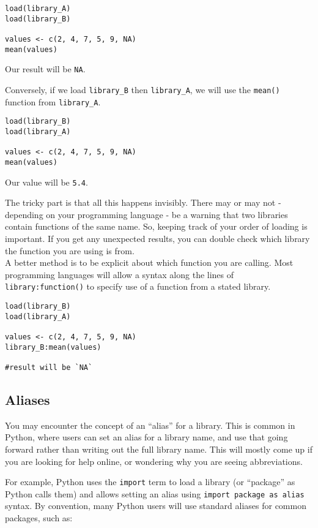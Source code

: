 \documentclass[
]{book}
\begin{document}
\begin{verbatim}
load(library_A)
load(library_B)

values <- c(2, 4, 7, 5, 9, NA)
mean(values)
\end{verbatim}

Our result will be \texttt{NA}.

Conversely, if we load \texttt{library\_B} then \texttt{library\_A}, we will use the \texttt{mean()} function from \texttt{library\_A}.

\begin{verbatim}
load(library_B)
load(library_A)

values <- c(2, 4, 7, 5, 9, NA)
mean(values)
\end{verbatim}

Our value will be \texttt{5.4}.

The tricky part is that all this happens invisibly. There may or may not - depending on your programming language - be a warning that two libraries contain functions of the same name. So, keeping track of your order of loading is important. If you get any unexpected results, you can double check which library the function you are using is from.\\

A better method is to be explicit about which function you are calling. Most programming languages will allow a syntax along the lines of \texttt{library:function()} to specify use of a function from a stated library.\\

\begin{verbatim}
load(library_B)
load(library_A)

values <- c(2, 4, 7, 5, 9, NA)
library_B:mean(values)

#result will be `NA`
\end{verbatim}

\subsection{Aliases}\label{aliases}

You may encounter the concept of an ``alias'' for a library. This is common in Python, where users can set an alias for a library name, and use that going forward rather than writing out the full library name. This will mostly come up if you are looking for help online, or wondering why you are seeing abbreviations.

For example, Python uses the \texttt{import} term to load a library (or ``package'' as Python calls them) and allows setting an alias using \texttt{import\ package\ as\ alias} syntax. By convention, many Python users will use standard aliases for common packages, such as:
\end{document}
